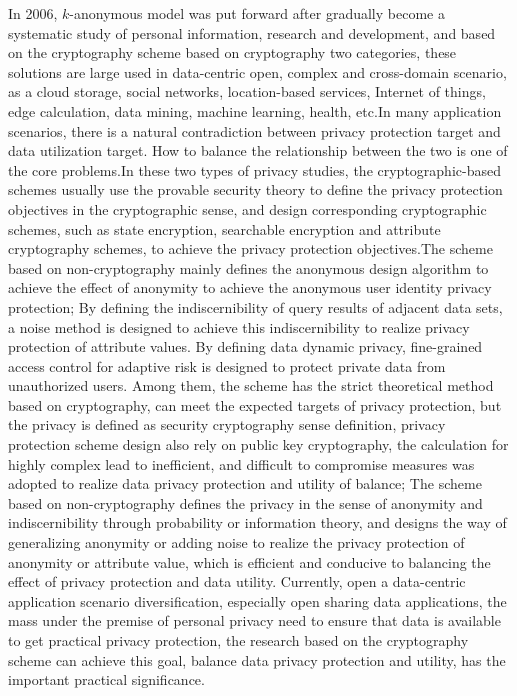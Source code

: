 \documentclass[pdftex,notypeinfo,twoside,openany,UTF8,fntef]{CASthesis}
\theoremstyle{THrm}{
	\newtheorem{question}{Question}[section]
	\newtheorem{property}{性质}[section]
	\newtheorem{assumption}{假设}[section]
	\newtheorem{claim}[lemma]{断言}
	
}
\begin{document}
In 2006,  $k$-anonymous model was put forward after gradually become a systematic study of personal information, research and development, and based on the cryptography scheme based on cryptography two categories, these solutions are large used in data-centric open, complex and cross-domain scenario, as a cloud storage, social networks, location-based services, Internet of things, edge calculation, data mining, machine learning, health, etc.In many application scenarios, there is a natural contradiction between privacy protection target and data utilization target. How to balance the relationship between the two is one of the core problems.In these two types of privacy studies, the cryptographic-based schemes usually use the provable security theory to define the privacy protection objectives in the cryptographic sense, and design corresponding cryptographic schemes, such as state encryption, searchable encryption and attribute cryptography schemes, to achieve the privacy protection objectives.The scheme based on non-cryptography mainly defines the anonymous design algorithm to achieve the effect of anonymity to achieve the anonymous user identity privacy protection; By defining the indiscernibility of query results of adjacent data sets, a noise method is designed to achieve this indiscernibility to realize privacy protection of attribute values. By defining data dynamic privacy, fine-grained access control for adaptive risk is designed to protect private data from unauthorized users. Among them, the scheme has the strict theoretical method based on cryptography, can meet the expected targets of privacy protection, but the privacy is defined as security cryptography sense definition, privacy protection scheme design also rely on public key cryptography, the calculation for highly complex lead to inefficient, and difficult to compromise measures was adopted to realize data privacy protection and utility of balance; The scheme based on non-cryptography defines the privacy in the sense of anonymity and indiscernibility through probability or information theory, and designs the way of generalizing anonymity or adding noise to realize the privacy protection of anonymity or attribute value, which is efficient and conducive to balancing the effect of privacy protection and data utility. Currently, open a data-centric application scenario diversification, especially open sharing data applications, the mass under the premise of personal privacy need to ensure that data is available to get practical privacy protection, the research based on the cryptography scheme can achieve this goal, balance data privacy protection and utility, has the important practical significance.
\end{document}

